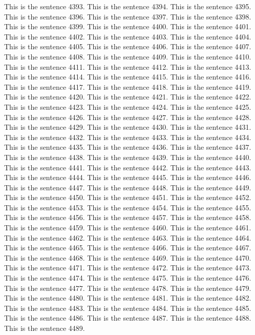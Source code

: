 \documentclass{article}
\begin{document}
This is the sentence 4393.
This is the sentence 4394.
This is the sentence 4395.
This is the sentence 4396.
This is the sentence 4397.
This is the sentence 4398.
This is the sentence 4399.
This is the sentence 4400.
This is the sentence 4401.
This is the sentence 4402.
This is the sentence 4403.
This is the sentence 4404.
This is the sentence 4405.
This is the sentence 4406.
This is the sentence 4407.
This is the sentence 4408.
This is the sentence 4409.
This is the sentence 4410.
This is the sentence 4411.
This is the sentence 4412.
This is the sentence 4413.
This is the sentence 4414.
This is the sentence 4415.
This is the sentence 4416.
This is the sentence 4417.
This is the sentence 4418.
This is the sentence 4419.
This is the sentence 4420.
This is the sentence 4421.
This is the sentence 4422.
This is the sentence 4423.
This is the sentence 4424.
This is the sentence 4425.
This is the sentence 4426.
This is the sentence 4427.
This is the sentence 4428.
This is the sentence 4429.
This is the sentence 4430.
This is the sentence 4431.
This is the sentence 4432.
This is the sentence 4433.
This is the sentence 4434.
This is the sentence 4435.
This is the sentence 4436.
This is the sentence 4437.
This is the sentence 4438.
This is the sentence 4439.
This is the sentence 4440.
This is the sentence 4441.
This is the sentence 4442.
This is the sentence 4443.
This is the sentence 4444.
This is the sentence 4445.
This is the sentence 4446.
This is the sentence 4447.
This is the sentence 4448.
This is the sentence 4449.
This is the sentence 4450.
This is the sentence 4451.
This is the sentence 4452.
This is the sentence 4453.
This is the sentence 4454.
This is the sentence 4455.
This is the sentence 4456.
This is the sentence 4457.
This is the sentence 4458.
This is the sentence 4459.
This is the sentence 4460.
This is the sentence 4461.
This is the sentence 4462.
This is the sentence 4463.
This is the sentence 4464.
This is the sentence 4465.
This is the sentence 4466.
This is the sentence 4467.
This is the sentence 4468.
This is the sentence 4469.
This is the sentence 4470.
This is the sentence 4471.
This is the sentence 4472.
This is the sentence 4473.
This is the sentence 4474.
This is the sentence 4475.
This is the sentence 4476.
This is the sentence 4477.
This is the sentence 4478.
This is the sentence 4479.
This is the sentence 4480.
This is the sentence 4481.
This is the sentence 4482.
This is the sentence 4483.
This is the sentence 4484.
This is the sentence 4485.
This is the sentence 4486.
This is the sentence 4487.
This is the sentence 4488.
This is the sentence 4489.
\end{document}
